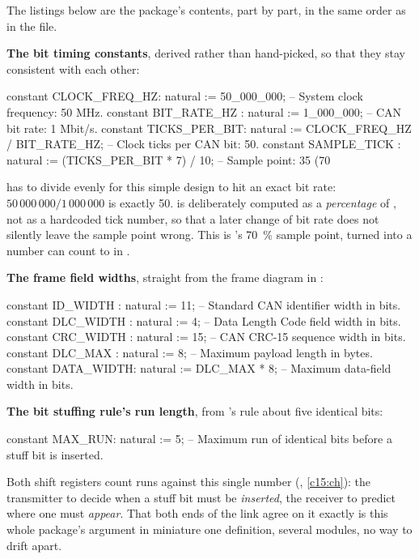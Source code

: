 The listings below are the package's contents, part by part, in the same order as in the file.

\textbf{The bit timing constants}, derived rather than hand-picked, so that they stay consistent with
each other:

\begin{vhdlcode}
constant CLOCK_FREQ_HZ: natural := 50_000_000;                  -- System clock frequency: 50 MHz.
constant BIT_RATE_HZ  : natural := 1_000_000;                   -- CAN bit rate: 1 Mbit/s.
constant TICKS_PER_BIT: natural := CLOCK_FREQ_HZ / BIT_RATE_HZ; -- Clock ticks per CAN bit: 50.
constant SAMPLE_TICK  : natural := (TICKS_PER_BIT * 7) / 10;    -- Sample point: 35 (70%
\end{vhdlcode}

 has to divide evenly for this simple design to hit an exact bit rate:
$50\,000\,000 / 1\,000\,000$ is exactly 50.  is deliberately computed as a
\emph{percentage} of , not as a hardcoded tick number, so that a later change of
bit rate does not silently leave the sample point wrong. This is
's 70~\% sample point, turned into a number  can count to
in .

\textbf{The frame field widths}, straight from the frame diagram in :

\begin{vhdlcode}
constant ID_WIDTH  : natural := 11;          -- Standard CAN identifier width in bits.
constant DLC_WIDTH : natural := 4;           -- Data Length Code field width in bits.
constant CRC_WIDTH : natural := 15;          -- CAN CRC-15 sequence width in bits.
constant DLC_MAX   : natural := 8;           -- Maximum payload length in bytes.
constant DATA_WIDTH: natural := DLC_MAX * 8; -- Maximum data-field width in bits.
\end{vhdlcode}

\textbf{The bit stuffing rule's run length}, from 's rule about five
identical bits:

\begin{vhdlcode}
constant MAX_RUN: natural := 5; -- Maximum run of identical bits before a stuff bit is inserted.
\end{vhdlcode}

Both shift registers count runs against this single number (, \ref{c15:ch}): the
transmitter to decide when a stuff bit must be \emph{inserted}, the receiver to predict where one
must \emph{appear}. That both ends of the link agree on it exactly is this whole package's argument
in miniature \textemdash{} one definition, several modules, no way to drift apart.


